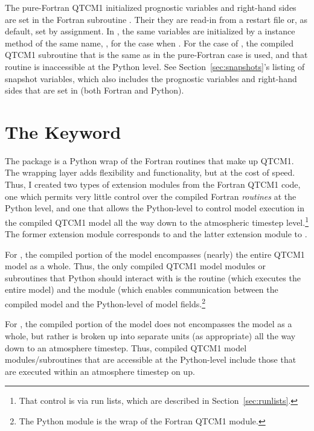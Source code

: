 The pure-Fortran QTCM1 initialized prognostic variables and
right-hand sides are set in the Fortran subroutine .
Their they are read-in from a restart file or, as default,
set by assignment.
In , the same variables are initialized by a 
instance method of the same name, , for the case when
.  For the case
of , the compiled
QTCM1 subroutine that is the same as in the pure-Fortran case is
used, and that routine is inaccessible at the Python level.
See Section~\ref{sec:snapshots}'s listing of snapshot variables,
which also includes the prognostic variables and right-hand sides that
are set in  (both Fortran and Python).




\section{The  Keyword}  \label{sec:compiledform}

The  package is a Python wrap of the Fortran routines
that make up QTCM1.  The wrapping layer adds flexibility and
functionality, but at the cost of speed.  Thus, I created two
types of extension modules from the Fortran QTCM1 code, one
which permits very little control over the compiled Fortran
\emph{routines} at the Python level, and one that allows the Python-level
to control model execution in the compiled QTCM1 model
all the way down to the atmospheric timestep level.\footnote%
	{That control is via run lists, which are described in
	Section~\ref{sec:runlists}.}
The former extension module corresponds to 
 and
the latter extension module to
.

For ,
the compiled portion of the model encompasses (nearly) the
entire QTCM1 model as a whole.  Thus, the only compiled QTCM1 model
modules or subroutines that Python should interact with is
the  routine (which executes the entire model) and
the  module (which enables communication between the
compiled model and the Python-level of model fields.\footnote%
	{The  Python module is the wrap of the
	Fortran QTCM1  module.}

For , the compiled
portion of the model does not encompasses the model as a whole, but
rather is broken up into separate units (as appropriate) all the
way down to an atmosphere timestep.  Thus, compiled QTCM1 model
modules/subroutines that are accessible at the Python-level include
those that are executed within an atmosphere timestep on up.

